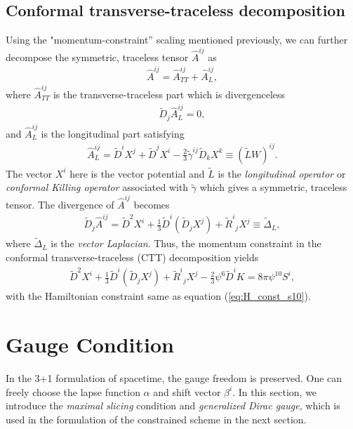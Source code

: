 \subsection{Conformal transverse-traceless decomposition}
Using the "momentum-constraint” scaling mentioned previously,
we can further decompose the symmetric, traceless tensor $\hat{A}^{ij}$ as
\begin{align}
    \hat{A}^{ij} = \hat{A}^{ij}_{TT} + \hat{A}^{ij}_{L},
\end{align}
where $\hat{A}^{ij}_{TT}$ is the transverse-traceless part which is divergenceless
\begin{align}
    \tilde{D}_j \hat{A}^{ij}_{L} = 0,
\end{align}
and $\hat{A}^{ij}_{L}$ is the longitudinal part satisfying
\begin{align}
    \hat{A}^{ij}_{L} = \tilde{D}^i X^j + \tilde{D}^j X^i - \frac{2}{3}\tilde{\gamma}^{ij} \tilde{D}_k X^k \equiv \left(\tilde{L} W \right)^{ij}.
\end{align}
The vector $X^i$ here is the vector potential 
and $\tilde{L}$ is the \textit{longitudinal operator} or \textit{conformal Killing operator} associated with $\tilde{\gamma}$
which gives a symmetric, traceless tensor.
The divergence of $\hat{A}^{ij}$ becomes
\begin{align}
    \tilde{D}_j \hat{A}^{ij} = \tilde{D}^2 X^i + \frac{1}{3} \tilde{D}^i \left( \tilde{D}_j X^j \right) + \tilde{R}^i{}_j X^j \equiv \tilde{\Delta}_{L},
\end{align}
where $\tilde{\Delta}_{L}$ is the \textit{vector Laplacian}.
Thus, the momentum constraint in the conformal transverse-traceless (CTT) decomposition yields
\begin{align}
    \tilde{D}^2 X^i + \frac{1}{3} \tilde{D}^i \left( \tilde{D}_j X^j \right) + \tilde{R}^i{}_j X^j - \frac{2}{3}\psi^6 \tilde{D}^i K = 8 \pi \psi^{10} S^i,
\end{align}
with the Hamiltonian constraint same as equation (\ref{eq:H_const_s10}).

\section{Gauge Condition}  %
\label{section2.4}
In the 3+1 formulation of spacetime, the gauge freedom is preserved.
One can freely choose the lapse function $\alpha$ and shift vector $\beta^i$.
In this section, we introduce the \textit{maximal slicing} condition and \textit{generalized Dirac gauge},
which is used in the formulation of the constrained scheme in the next section.

